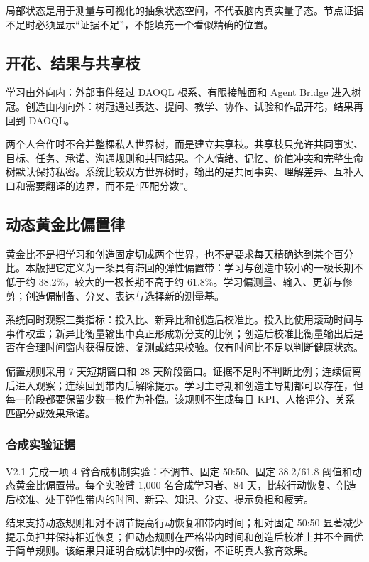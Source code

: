 \documentclass[UTF8,a4paper,11pt]{ctexart}
\begin{document}
局部状态是用于测量与可视化的抽象状态空间，不代表脑内真实量子态。节点证据不足时必须显示“证据不足”，不能填充一个看似精确的位置。

\subsection{开花、结果与共享枝}

学习由外向内：外部事件经过 DAOQL 根系、有限接触面和 Agent Bridge 进入树冠。创造由内向外：树冠通过表达、提问、教学、协作、试验和作品开花，结果再回到 DAOQL。

两个人合作时不合并整棵私人世界树，而是建立共享枝。共享枝只允许共同事实、目标、任务、承诺、沟通规则和共同结果。个人情绪、记忆、价值冲突和完整生命树默认保持私密。系统比较双方世界树时，输出的是共同事实、理解差异、互补入口和需要翻译的边界，而不是“匹配分数”。

\subsection{动态黄金比偏置律}

黄金比不是把学习和创造固定切成两个世界，也不是要求每天精确达到某个百分比。本版把它定义为一条具有滞回的弹性偏置带：学习与创造中较小的一极长期不低于约 38.2\%，较大的一极长期不高于约 61.8\%。学习偏测量、输入、更新与修剪；创造偏制备、分叉、表达与选择新的测量基。

系统同时观察三类指标：投入比、新异比和创造后校准比。投入比使用滚动时间与事件权重；新异比衡量输出中真正形成新分支的比例；创造后校准比衡量输出后是否在合理时间窗内获得反馈、复测或结果校验。仅有时间比不足以判断健康状态。

偏置规则采用 7 天短期窗口和 28 天阶段窗口。证据不足时不判断比例；连续偏离后进入观察；连续回到带内后解除提示。学习主导期和创造主导期都可以存在，但每一阶段都要保留少数一极作为补偿。该规则不生成每日 KPI、人格评分、关系匹配分或效果承诺。

\subsubsection{合成实验证据}

V2.1 完成一项 4 臂合成机制实验：不调节、固定 50:50、固定 38.2/61.8 阈值和动态黄金比偏置带。每个实验臂 1,000 名合成学习者、84 天，比较行动恢复、创造后校准、处于弹性带内的时间、新异、知识、分支、提示负担和疲劳。

结果支持动态规则相对不调节提高行动恢复和带内时间；相对固定 50:50 显著减少提示负担并保持相近恢复；但动态规则在严格带内时间和创造后校准上并不全面优于简单规则。该结果只证明合成机制中的权衡，不证明真人教育效果。
\end{document}
